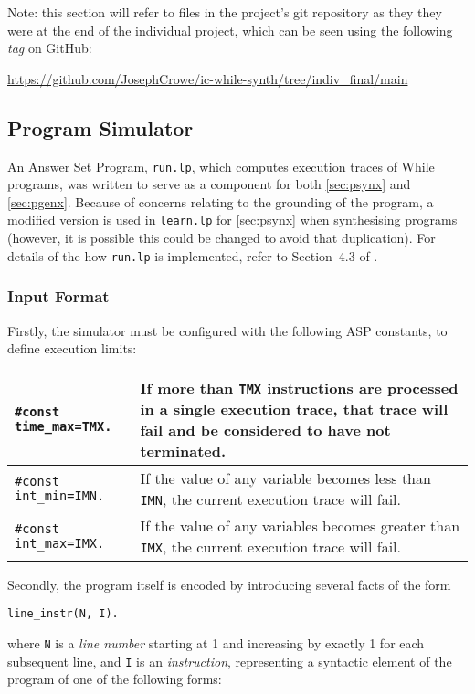 \documentclass[a4paper,twoside,notitlepage,12pt]{article}
\begin{document}
Note: this section will refer to files in the project's git repository as they they 
were at the end of the individual project, which can be seen using the following 
\emph{tag} on GitHub:

\begin{center} 
    \url{https://github.com/JosephCrowe/ic-while-synth/tree/indiv_final/main}
\end{center}

\subsection{Program Simulator}

An Answer Set Program, \verb|run.lp|, which computes execution traces of While 
programs, was written to serve as a component for both \ref{sec:psynx} and 
\ref{sec:pgenx}. Because of concerns relating to the grounding of the program, a 
modified version is used in \verb|learn.lp| for \ref{sec:psynx} when synthesising 
programs (however, it is possible this could be changed to avoid that duplication). For 
details of the how \verb|run.lp| is implemented, refer to Section~4.3 of \cite{final}.

\subsubsection{Input Format}

Firstly, the simulator must be configured with the following ASP constants, to define 
execution limits:

\begin{tabularx}{\textwidth}{|l|X|}
\hline
\verb|#const time_max=TMX.| &
If more than \verb|TMX| instructions are processed in a single execution trace, that 
trace will fail and be considered to have not terminated. \\
\hline
\verb|#const int_min=IMN.| &
If the value of any variable becomes less than \verb|IMN|, the current execution trace 
will fail. \\
\hline
\verb|#const int_max=IMX.| &
If the value of any variables becomes greater than \verb|IMX|, the current execution 
trace will fail. \\
\hline
\end{tabularx}

Secondly, the program itself is encoded by introducing several facts of the form
\begin{verbatim}
line_instr(N, I).
\end{verbatim}
where \verb|N| is a \emph{line number} starting at 1 and increasing by exactly 1 for
each subsequent line, and \verb|I| is an \emph{instruction}, representing a syntactic
element of the program of one of the following forms:
\end{document}
